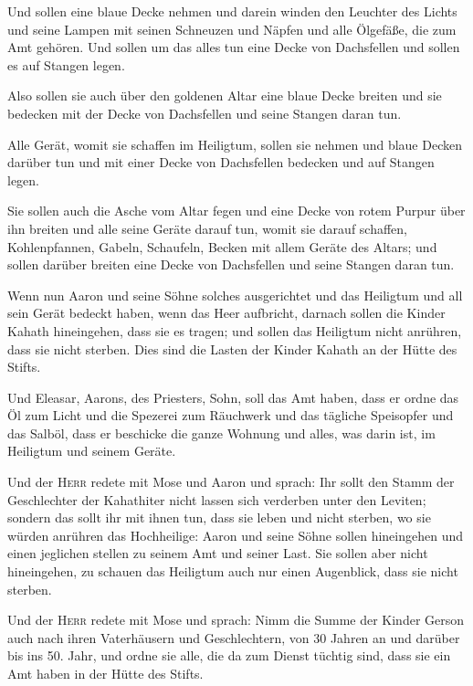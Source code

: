  Und sollen eine blaue Decke nehmen und darein winden den
Leuchter des Lichts und seine Lampen mit seinen Schneuzen und Näpfen und
alle Ölgefäße, die zum Amt gehören.  Und sollen um das
alles tun eine Decke von Dachsfellen und sollen es auf Stangen legen.

 Also sollen sie auch über den goldenen Altar eine blaue
Decke breiten und sie bedecken mit der Decke von Dachsfellen und seine
Stangen daran tun.

 Alle Gerät, womit sie schaffen im Heiligtum, sollen sie
nehmen und blaue Decken darüber tun und mit einer Decke von Dachsfellen
bedecken und auf Stangen legen.

 Sie sollen auch die Asche vom Altar fegen und eine Decke
von rotem Purpur über ihn breiten  und alle seine Geräte
darauf tun, womit sie darauf schaffen, Kohlenpfannen, Gabeln, Schaufeln,
Becken mit allem Geräte des Altars; und sollen darüber breiten eine
Decke von Dachsfellen und seine Stangen daran tun.

 Wenn nun Aaron und seine Söhne solches ausgerichtet und
das Heiligtum und all sein Gerät bedeckt haben, wenn das Heer aufbricht,
darnach sollen die Kinder Kahath hineingehen, dass sie es tragen; und
sollen das Heiligtum nicht anrühren, dass sie nicht sterben. Dies sind
die Lasten der Kinder Kahath an der Hütte des Stifts.

 Und Eleasar, Aarons, des Priesters, Sohn, soll das Amt
haben, dass er ordne das Öl zum Licht und die Spezerei zum Räuchwerk und
das tägliche Speisopfer und das Salböl, dass er beschicke die ganze
Wohnung und alles, was darin ist, im Heiligtum und seinem Geräte.

 Und der \textsc{Herr} redete mit Mose und Aaron und
sprach:  Ihr sollt den Stamm der Geschlechter der
Kahathiter nicht lassen sich verderben unter den Leviten;
 sondern das sollt ihr mit ihnen tun, dass sie leben und
nicht sterben, wo sie würden anrühren das Hochheilige: Aaron und seine
Söhne sollen hineingehen und einen jeglichen stellen zu seinem Amt und
seiner Last.  Sie sollen aber nicht hineingehen, zu
schauen das Heiligtum auch nur einen Augenblick, dass sie nicht sterben.

 Und der \textsc{Herr} redete mit Mose und sprach:
 Nimm die Summe der Kinder Gerson auch nach ihren
Vaterhäusern und Geschlechtern,  von 30 Jahren an und
darüber bis ins 50. Jahr, und ordne sie alle, die da zum Dienst tüchtig
sind, dass sie ein Amt haben in der Hütte des Stifts.

